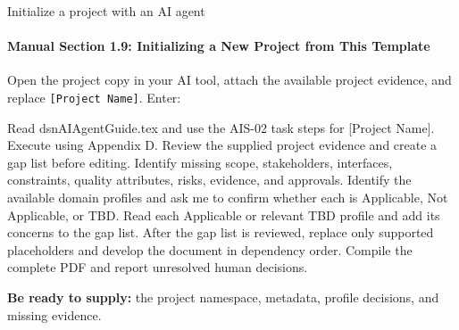 \begin{frame}{Initialize a project with an AI agent}
\framesubtitle{Manual Section 1.9: Initializing a New Project from This Template}
{\small Open the project copy in your AI tool, attach the available project evidence, and replace \mbox{\texttt{[Project Name]}}. Enter:\par}
\vspace{0.2cm}
\begingroup\small\ttfamily\raggedright
\noindent Read dsnAIAgentGuide.tex and use the AIS-02 task steps for [Project Name]. Execute using Appendix D. Review the supplied project evidence and create a gap list before editing. Identify missing scope, stakeholders, interfaces, constraints, quality attributes, risks, evidence, and approvals. Identify the available domain profiles and ask me to confirm whether each is Applicable, Not Applicable, or TBD. Read each Applicable or relevant TBD profile and add its concerns to the gap list. After the gap list is reviewed, replace only supported placeholders and develop the document in dependency order. Compile the complete PDF and report unresolved human decisions.\par
\endgroup
\vspace{0.2cm}
{\small\textbf{Be ready to supply:} the project namespace, metadata, profile decisions, and missing evidence.}
\end{frame}
